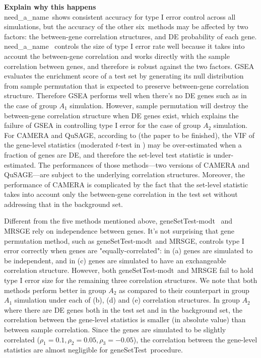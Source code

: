 \documentclass[useAMS,usenatbib, galley]{biom}
\newcommand{\OurMethod}{need\_a\_name}
\newcommand{\HowmanyTest}{six}
\newcommand{\aaCase}{a}
\newcommand{\aCase}{b}
\newcommand{\cCase}{c}
\newcommand{\eCase}{d}
\newcommand{\fCase}{e}
\newcommand{\gent}{geneSetTest-modt}
\newcommand{\gen}{geneSetTest}
\begin{document}
	\textbf{Explain why this happens}\\
	\OurMethod~shows consistent accuracy for type I error control across all simulations, but the accuracy of the other \HowmanyTest~methods may be affected by two factors: the between-gene correlation structures, and DE probability of each gene. \OurMethod~ controls the size of type I error rate well because it takes into account the between-gene correlation and works directly with the sample correlation between genes, and therefore is robust against the two factors. GSEA evaluates the enrichment score of a test set by generating its null distribution from sample permutation that is expected to preserve between-gene correlation structure. Therefore GSEA performs well when there's no DE genes such as in the case of group $A_1$ simulation. However, sample permutation will destroy the between-gene correlation structure when DE genes exist, which explains the failure of GSEA in controlling type I error for the case of group $A_2$ simulation. For CAMERA and QuSAGE, according to (the paper to be finished), the VIF of the gene-level statistics (moderated $t$-test in \cite{wu2012camera}) may be over-estimated when a fraction of genes are DE, and therefore the set-level test statistic is under-estimated. The performances of those methods---two versions of CAMERA and QuSAGE---are subject to the underlying correlation structures. Moreover, the performance of CAMERA is complicated by the fact that the set-level statistic takes into account only the between-gene correlation in the test set without addressing that in the background set.
	
	Different from the five methods mentioned above, \gent~ and MRSGE rely on independence between genes. It's not surprising that gene permutation method, such as \gent~and MRSGE, controls type I error correctly when genes are "equally-correlated": in (\aaCase) genes are simulated to be independent, and in (\cCase) genes are simulated to have an exchangeable correlation structure. However, both \gent~and MRSGE fail to hold type I error size for the remaining three correlation structures. We note that both methods perform better in group $A_2$ as compared to their counterpart in group $A_1$ simulation under each of (\aCase), (\eCase) and (\fCase) correlation structures. In group $A_2$ where there are DE genes both in the test set and in the background set, the correlation between the gene-level statistics is smaller (in absolute value) than between sample correlation. Since the genes are simulated to be slightly correlated ($\rho_1=0.1, \rho_2 = 0.05, \rho_3 = -0.05$), the correlation between the gene-level statistics are almost negligible for \gen~procedure. 
	
\end{document}
